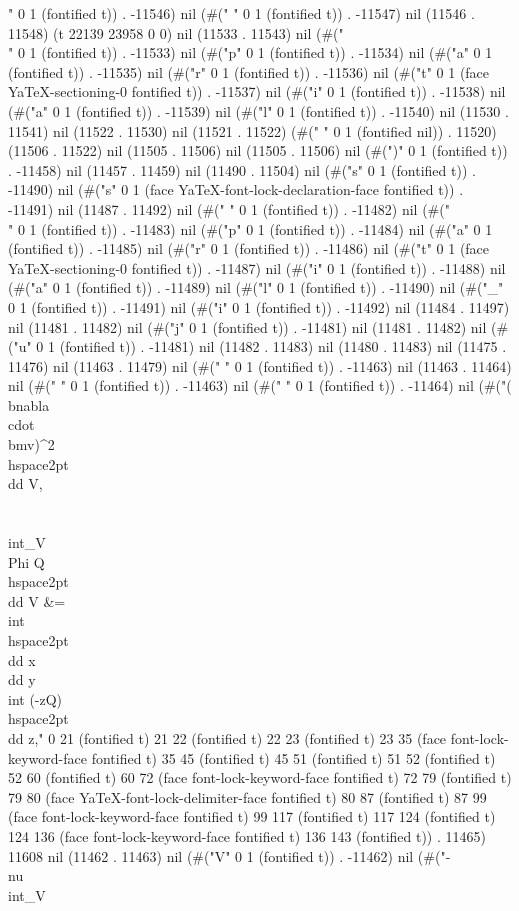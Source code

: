 " 0 1 (fontified t)) . -11546) nil (#(" " 0 1 (fontified t)) . -11547) nil (11546 . 11548) (t 22139 23958 0 0) nil (11533 . 11543) nil (#("\\" 0 1 (fontified t)) . -11533) nil (#("p" 0 1 (fontified t)) . -11534) nil (#("a" 0 1 (fontified t)) . -11535) nil (#("r" 0 1 (fontified t)) . -11536) nil (#("t" 0 1 (face YaTeX-sectioning-0 fontified t)) . -11537) nil (#("i" 0 1 (fontified t)) . -11538) nil (#("a" 0 1 (fontified t)) . -11539) nil (#("l" 0 1 (fontified t)) . -11540) nil (11530 . 11541) nil (11522 . 11530) nil (11521 . 11522) (#(" " 0 1 (fontified nil)) . 11520) (11506 . 11522) nil (11505 . 11506) nil (11505 . 11506) nil (#(")" 0 1 (fontified t)) . -11458) nil (11457 . 11459) nil (11490 . 11504) nil (#("s" 0 1 (fontified t)) . -11490) nil (#("s" 0 1 (face YaTeX-font-lock-declaration-face fontified t)) . -11491) nil (11487 . 11492) nil (#(" " 0 1 (fontified t)) . -11482) nil (#("\\" 0 1 (fontified t)) . -11483) nil (#("p" 0 1 (fontified t)) . -11484) nil (#("a" 0 1 (fontified t)) . -11485) nil (#("r" 0 1 (fontified t)) . -11486) nil (#("t" 0 1 (face YaTeX-sectioning-0 fontified t)) . -11487) nil (#("i" 0 1 (fontified t)) . -11488) nil (#("a" 0 1 (fontified t)) . -11489) nil (#("l" 0 1 (fontified t)) . -11490) nil (#("_" 0 1 (fontified t)) . -11491) nil (#("i" 0 1 (fontified t)) . -11492) nil (11484 . 11497) nil (11481 . 11482) nil (#("j" 0 1 (fontified t)) . -11481) nil (11481 . 11482) nil (#("u" 0 1 (fontified t)) . -11481) nil (11482 . 11483) nil (11480 . 11483) nil (11475 . 11476) nil (11463 . 11479) nil (#(" " 0 1 (fontified t)) . -11463) nil (11463 . 11464) nil (#("
" 0 1 (fontified t)) . -11463) nil (#(" " 0 1 (fontified t)) . -11464) nil (#("(\\bnabla\\cdot\\bm{v})^2 \\hspace{2pt}\\dd V, \\\\
 \\int_V \\Phi Q \\hspace{2pt} \\dd V &= \\int \\hspace{2pt} \\dd x \\dd y \\int
 (-zQ) \\hspace{2pt} \\dd z," 0 21 (fontified t) 21 22 (fontified t) 22 23 (fontified t) 23 35 (face font-lock-keyword-face fontified t) 35 45 (fontified t) 45 51 (fontified t) 51 52 (fontified t) 52 60 (fontified t) 60 72 (face font-lock-keyword-face fontified t) 72 79 (fontified t) 79 80 (face YaTeX-font-lock-delimiter-face fontified t) 80 87 (fontified t) 87 99 (face font-lock-keyword-face fontified t) 99 117 (fontified t) 117 124 (fontified t) 124 136 (face font-lock-keyword-face fontified t) 136 143 (fontified t)) . 11465) 11608 nil (11462 . 11463) nil (#("V" 0 1 (fontified t)) . -11462) nil (#("- \\nu\\int_V
